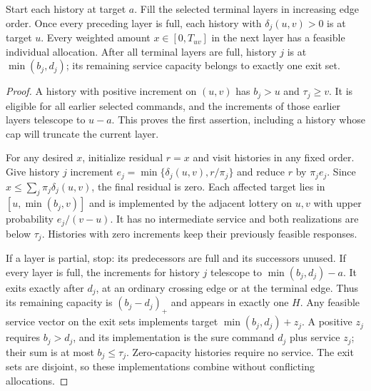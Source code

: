 \begin{lemma}\label{lem:nested54}
Start each history at target $a$. Fill the selected terminal layers in increasing edge order. Once every preceding layer is full, each history with $\delta_j(u,v)>0$ is at target $u$. Every weighted amount $x\in[0,T_{uv}]$ in the next layer has a feasible individual allocation. After all terminal layers are full, history $j$ is at $\min(b_j,d_j)$; its remaining service capacity belongs to exactly one exit set.
\end{lemma}
\begin{proof}
A history with positive increment on $(u,v)$ has $b_j>u$ and $\tau_j\geq v$. It is eligible for all earlier selected commands, and the increments of those earlier layers telescope to $u-a$. This proves the first assertion, including a history whose cap will truncate the current layer.

For any desired $x$, initialize residual $r=x$ and visit histories in any fixed order. Give history $j$ increment $e_j=\min\{\delta_j(u,v),r/\pi_j\}$ and reduce $r$ by $\pi_je_j$. Since $x\leq\sum_j\pi_j\delta_j(u,v)$, the final residual is zero. Each affected target lies in $[u,\min(b_j,v)]$ and is implemented by the adjacent lottery on $u,v$ with upper probability $e_j/(v-u)$. It has no intermediate service and both realizations are below $\tau_j$. Histories with zero increments keep their previously feasible responses.

If a layer is partial, stop: its predecessors are full and its successors unused. If every layer is full, the increments for history $j$ telescope to $\min(b_j,d_j)-a$. It exits exactly after $d_j$, at an ordinary crossing edge or at the terminal edge. Thus its remaining capacity is $(b_j-d_j)_+$ and appears in exactly one $H$. Any feasible service vector on the exit sets implements target $\min(b_j,d_j)+z_j$. A positive $z_j$ requires $b_j>d_j$, and its implementation is the sure command $d_j$ plus service $z_j$; their sum is at most $b_j\leq\tau_j$. Zero-capacity histories require no service. The exit sets are disjoint, so these implementations combine without conflicting allocations.
\end{proof}

